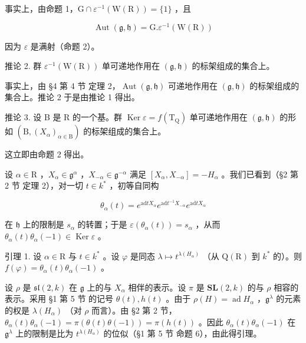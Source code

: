 事实上，由命题 1，\(\mathrm{G} \cap \varepsilon^{-1}(\mathrm{W}(\mathrm{R})) = \{1\}\) ，且

\[
\operatorname{Aut} (\mathfrak {g}, \mathfrak {h}) = \mathrm{G}. \varepsilon^ {- 1} (\mathrm{W(R)})
\]

因为 \(\varepsilon\) 是满射（命题 2）。

推论 2. 群 \(\varepsilon^{-1}(\mathrm{W}(\mathrm{R}))\) 单可递地作用在 \((\mathfrak{g},\mathfrak{h})\) 的标架组成的集合上。

事实上，由 §4 第 4 节 定理 2，\(\operatorname{Aut}(\mathfrak{g},\mathfrak{h})\) 可递地作用在 \((\mathfrak{g},\mathfrak{h})\) 的标架组成的集合上。推论 2 于是由推论 1 得出。

推论 3. 设 B 是 R 的一个基。群 \(\operatorname{Ker} \varepsilon = f(\mathrm{T}_{\mathrm{Q}})\) 单可递地作用在 \((\mathfrak{g}, \mathfrak{h})\) 的形如 \((\mathrm{B}, (X_{\alpha})_{\alpha \in \mathrm{B}})\) 的标架组成的集合上。

这立即由命题 2 得出。

设 \(\alpha \in \mathrm{R}\) ，\(X_{\alpha} \in \mathfrak{g}^{\alpha}\) ，\(X_{-\alpha} \in \mathfrak{g}^{-\alpha}\) 满足 \([X_{\alpha}, X_{-\alpha}] = -H_{\alpha}\) 。我们已看到（§2 第 2 节 定理 2），对一切 \(t \in k^{*}\) ，初等自同构

\[
\theta_ {\alpha} (t) = e ^ {\mathrm{ad} t X _ {\alpha}} e ^ {\mathrm{ad} t ^ {- 1} X _ {- \alpha}} e ^ {\mathrm{ad} t X _ {\alpha}}
\]

在 \(\mathfrak{h}\) 上的限制是 \(s_{\alpha}\) 的转置；于是 \(\varepsilon(\theta_{\alpha}(t)) = s_{\alpha}\) ，从而 \(\theta_{\alpha}(t)\theta_{\alpha}(-1) \in \operatorname{Ker} \varepsilon\) 。

引理 1. 设 \(\alpha \in \mathrm{R}\) 与 \(t\in k^{*}\) 。设 \(\varphi\) 是同态 \(\lambda \mapsto t^{\lambda (H_{\alpha})}\) （从 \(\mathrm{Q(R)}\) 到 \(k^*\) 的）。则 \(f(\varphi) = \theta_{\alpha}(t)\theta_{\alpha}(-1)\) 。

设 \(\rho\) 是 \(\mathfrak{sl}(2,k)\) 在 \(\mathfrak{g}\) 上的与 \(X_{\alpha}\) 相伴的表示。设 \(\pi\) 是 \(\mathbf{SL}(2,k)\) 的与 \(\rho\) 相容的表示。采用 §1 第 5 节 的记号 \(\theta(t), h(t)\) 。由于 \(\rho(H) = \operatorname{ad} H_{\alpha}\) ，\(\mathfrak{g}^{\lambda}\) 的元素的权是 \(\lambda(H_{\alpha})\) （对 \(\rho\) 而言）。由 §2 第 2 节，\(\theta_{\alpha}(t)\theta_{\alpha}(-1) = \pi(\theta(t)\theta(-1)) = \pi(h(t))\) 。因此 \(\theta_{\alpha}(t)\theta_{\alpha}(-1)\) 在 \(\mathfrak{g}^{\lambda}\) 上的限制是比为 \(t^{\lambda(H_{\alpha})}\) 的位似（§1 第 5 节 命题 6），由此得引理。

